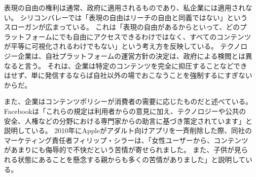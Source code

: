 \documentclass[paper=a4,book,openany]{jlreq}
\begin{document}
表現の自由の権利は通常、政府に適用されるものであり、私企業には適用されない。
シリコンバレーでは「表現の自由はリーチの自由と同義ではない」というスローガンが広まっている。
これは「表現の自由があるからといって、どのプラットフォームにでも自由にアクセスできるわけではなく、すべてのコンテンツが平等に可視化されるわけでもない」という考え方を反映している。
テクノロジー企業は、自社プラットフォームの運営方針の決定は、政府による検閲とは異なると言う。
それは、企業は特定のコンテンツを完全に抑圧することなどできはせず、単に発信するならば自社以外の場でおこなうことを強制するにすぎないからだ。

また、企業はコンテンツポリシーが消費者の需要に応じたものだと述べている。
Facebookは「これらの規定は利用者からの意見に加え、テクノロジーや公共の安全、人権などの分野における専門家からの助言に基づき策定されています」と説明している\citep{facebook25:_commun_stand}。
2010年にAppleがアダルト向けアプリを一斉削除した際、同社のマーケティング責任者フィリップ・シラーは、「女性ユーザーから、コンテンツがあまりにも侮辱的で不快だという苦情が寄せられました。
また、子供が見られる状態にあることを懸念する親からも多くの苦情がありました」と説明している\citep{wortham10:_apple_bans_some_apps_sex_tinged_conten}。
\end{document}
